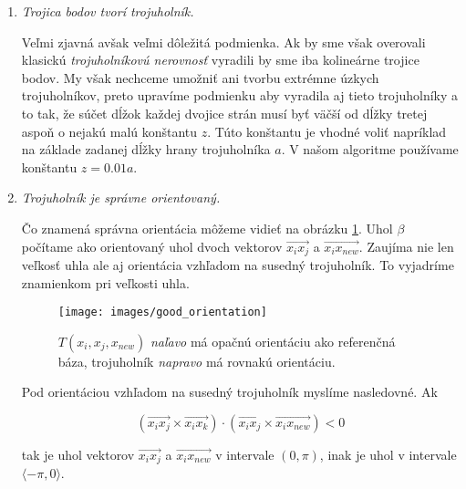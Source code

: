 \begin{enumerate}
    \item{
        \textit{Trojica bodov tvorí trojuholník.}


        Veľmi zjavná avšak veľmi dôležitá podmienka. Ak by sme však overovali klasickú 
        \textit{trojuholníkovú nerovnosť} vyradili by sme iba kolineárne trojice bodov. My však nechceme 
        umožniť ani tvorbu extrémne úzkych trojuholníkov, preto upravíme podmienku aby vyradila aj tieto
        trojuholníky a to tak, že súčet dĺžok každej dvojice strán musí byť väčší od dĺžky tretej aspoň
        o nejakú malú konštantu $z$. Túto konštantu je vhodné voliť napríklad na základe zadanej dĺžky 
        hrany trojuholníka $a$. V našom algoritme používame konštantu $z = 0.01 a$. 
    } 

    \item{
        \textit{Trojuholník je správne orientovaný.}


        Čo znamená správna orientácia môžeme vidieť na obrázku \ref{obr:good_orientation}. Uhol $\beta$
        počítame ako orientovaný uhol dvoch vektorov $\overrightarrow{x_i x_j}$ a $\overrightarrow{x_i x_{new}}$.
        Zaujíma nie len veľkosť uhla ale aj orientácia vzhľadom na susedný trojuholník. To 
        vyjadríme znamienkom pri veľkosti uhla. 

        \begin{figure}
            \centerline{\texttt{[image: images/good\_orientation]}}
            \caption[Orientácia bázy vzhľadom na referenčnú bázu]
            {$T(x_i, x_j, x_{new})$ \textit{naľavo} má opačnú orientáciu ako referenčná báza, 
            trojuholník \textit{napravo} má rovnakú orientáciu.}
            \label{obr:good_orientation}
        \end{figure}

        Pod orientáciou vzhľadom na susedný trojuholník myslíme nasledovné.
        Ak

        \begin{equation}
        \label{eq:vector_space_orientation}
        (\overrightarrow{x_i x_j} \times \overrightarrow{x_i x_k}) 
        \cdot (\overrightarrow{x_i x_j} \times \overrightarrow{x_i x_{new}}) < 0
        \end{equation}

        tak je uhol vektorov $\overrightarrow{x_i x_j}$ a $\overrightarrow{x_i x_{new}}$ v intervale $(0, \pi)$, inak 
        je uhol v intervale $ \langle -\pi, 0 \rangle$.
        
}
\end{enumerate}
